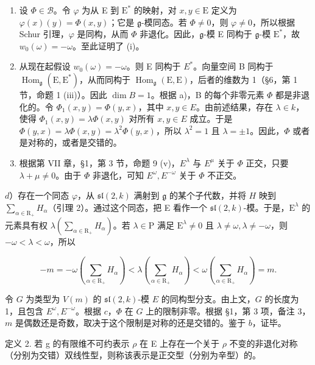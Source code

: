 \begin{enumerate}
\def\labelenumi{\alph{enumi})}
\item
  设 \(\Phi \in \mathcal{B}\)。令 \(\varphi\) 为从 E 到 \(\mathrm{E}^*\) 的映射，对 \(x, y \in \mathrm{E}\) 定义为 \(\varphi(x)(y) = \Phi(x, y)\)；它是 \(\mathfrak{g}\)-模同态。若 \(\Phi \neq 0\)，则 \(\varphi \neq 0\)，所以根据 Schur 引理，\(\varphi\) 是同构，从而 \(\Phi\) 非退化。因此，\(\mathfrak{g}\)-模 E 同构于 \(\mathfrak{g}\)-模 \(\mathrm{E}^*\)，故 \(w_0(\omega) = -\omega\)。至此证明了 (i)。
\item
  从现在起假设 \(w_{0}(\omega) = -\omega\)。则 E 同构于 \(E^{*}\)。向量空间 B 同构于 \(\operatorname{Hom}_{\mathfrak{g}}(\mathrm{E}, \mathrm{E}^{*})\)，从而同构于 \(\operatorname{Hom}_{\mathfrak{g}}(\mathrm{E}, \mathrm{E})\)，后者的维数为 1（§6，第 1 节，命题 1 (iii)）。因此 \(\dim B = 1\)。根据 a)，B 的每个非零元素 \(\Phi\) 都是非退化的。令 \(\Phi_{1}(x, y) = \Phi(y, x)\)，其中 \(x, y \in E\)。由前述结果，存在 \(\lambda \in k\)，使得 \(\Phi_{1}(x, y) = \lambda \Phi(x, y)\) 对所有 \(x, y \in E\) 成立。于是 \(\Phi(y, x) = \lambda \Phi(x, y) = \lambda^{2} \Phi(y, x)\)，所以 \(\lambda^{2} = 1\) 且 \(\lambda = \pm 1\)。因此，\(\Phi\) 或者是对称的，或者是交错的。
\item
根据第 VII 章，§1，第 3 节，命题 9 (v)，\(E^{\lambda}\) 与 \(E^{\mu}\) 关于 \(\Phi\) 正交，只要 \(\lambda + \mu \neq 0\)。由于 \(\Phi\) 非退化，可知 \(E^{\omega}, E^{-\omega}\) 关于 \(\Phi\) 不正交。
\end{enumerate}

\(d\)）存在一个同态 \(\varphi\)，从 \(\mathfrak{sl}(2,k)\) 满射到 \(\mathfrak{g}\) 的某个子代数，并将 \(H\) 映到 \(\sum_{\alpha \in \mathrm{R}_{+}}H_{\alpha}\)（引理 2）。通过这个同态，把 E 看作一个 \(\mathfrak{sl}(2,k)\)-模。于是，\(\mathrm{E}^{\lambda}\) 的元素具有权 \(\lambda \left(\sum_{\alpha \in \mathrm{R}_{+}}H_\alpha\right)\)。若 \(\lambda \in \mathrm{P}\) 满足 \(\mathrm{E}^{\lambda} \neq 0\) 且 \(\lambda \neq \omega, \lambda \neq -\omega\)，则 \(-\omega < \lambda < \omega\)，所以

\[
- m = - \omega \left(\sum_ {\alpha \in \mathrm{R} _ {+}} H _ {\alpha}\right) <   \lambda \left(\sum_ {\alpha \in \mathrm{R} _ {+}} H _ {\alpha}\right) <   \omega \left(\sum_ {\alpha \in \mathrm{R} _ {+}} H _ {\alpha}\right) = m.
\]

令 \(G\) 为类型为 \(V(m)\) 的 \(\mathfrak{sl}(2, k)\)-模 \(E\) 的同构型分支。由上文，\(G\) 的长度为 1，且包含 \(E^{\omega}, E^{-\omega}\)。根据 \(c\)，\(\Phi\) 在 \(G\) 上的限制非零。根据 §1，第 3 项，备注 3，\(m\) 是偶数还是奇数，取决于这个限制是对称的还是交错的。鉴于 \(b\)，证毕。

定义 2. 若 g 的有限维不可约表示 \(\rho\) 在 E 上存在一个关于 \(\rho\) 不变的非退化对称（分别为交错）双线性型，则称该表示是正交型（分别为辛型）的。

